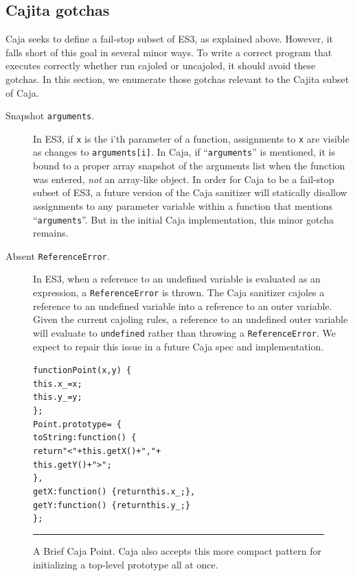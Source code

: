\documentclass[letterpaper,twocolumn,10pt]{article}
\newcommand{\code}[1]{{\tt {#1}}}              %
\begin{document}
\subsection{Cajita gotchas}

Caja seeks to define a fail-stop subset of ES3, as explained above. However, 
it falls short of this goal in several minor ways. To write a correct program 
that executes correctly whether run cajoled or uncajoled, it should 
avoid these gotchas. In this section, we enumerate those gotchas relevant to 
the Cajita subset of Caja.

\begin{description}

  \item[Snapshot \code{arguments}.] In ES3, if \code{x} is the i'th parameter 
  of a function, assignments to \code{x} are visible as changes to 
  \code{arguments[i]}. In Caja, if ``\code{arguments}'' is mentioned, it is 
  bound to a proper array snapshot of the arguments list when the function 
  was entered, \emph{not} an array-like object. In order for Caja to be a 
  fail-stop subset of ES3, a future version of the Caja sanitizer will 
  statically disallow assignments to any parameter variable within a function 
  that mentions ``\code{arguments}''. But in the initial Caja implementation, 
  this minor gotcha remains.
  
  \item[Absent \code{ReferenceError}.] In ES3, when a reference to an 
  undefined variable is evaluated as an expression, a \code{ReferenceError} 
  is thrown. The Caja sanitizer cajoles a reference to an undefined variable 
  into a reference to an outer variable. Given the current cajoling rules, a 
  reference to an undefined outer variable will evaluate to \code{undefined} 
  rather than throwing a \code{ReferenceError}. We expect to repair this 
  issue in a future Caja spec and implementation.
  
\end{description}

\begin{figure}[t!]
\begin{alltt}
function Point(x, y)\ \{
  this.x\_ = x;
  this.y\_ = y;
\};
Point.prototype =\ \{
  toString: function()\ \{ 
    return "<" + this.getX() + "," + 
                 this.getY() + ">"; 
  \},
  getX: function()\ \{ return this.x\_; \},
  getY: function()\ \{ return this.y\_; \}
\};
\end{alltt}

\caption[A Brief Caja Point.]{A Brief Caja Point. Caja also accepts this more
compact pattern for initializing a top-level prototype all at once.
\\ } \hrule
\label{fig:brief-caja-point}
\end{figure}
\end{document}
